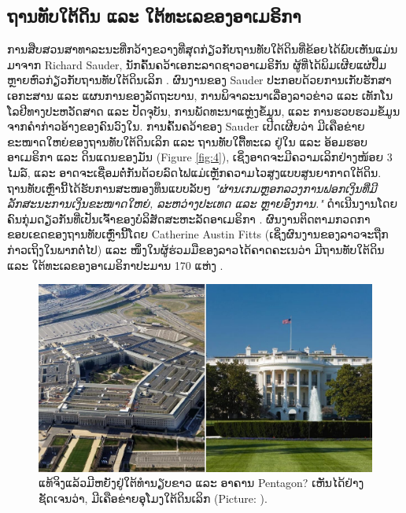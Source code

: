 \documentclass[10pt,twocolumn,letterpaper]{article}
\begin{document}
\subsection{ຖານທັບໃຕ້ດິນ ແລະ ໃຕ້ທະເລຂອງອາເມຣິກາ}

ການສືບສວນສາທາລະນະທີ່ກວ້າງຂວາງທີ່ສຸດກ່ຽວກັບຖານທັບໃຕ້ດິນທີ່ຂ້ອຍໄດ້ພົບເຫັນແມ່ນມາຈາກ Richard Sauder, ນັກຄົ້ນຄວ້າເອກະລາດຊາວອາເມຣິກັນ ຜູ້ທີ່ໄດ້ພິມເຜີຍແຜ່ປຶ້ມຫຼາຍຫົວກ່ຽວກັບຖານທັບໃຕ້ດິນເລິກ \cite{22}. 
ຜົນງານຂອງ Sauder ປະກອບດ້ວຍການເກັບຮັກສາເອກະສານ ແລະ ແຜນການຂອງລັດຖະບານ, ການພິຈາລະນາເລື່ອງລາວຂ່າວ ແລະ ເທັກໂນໂລຢີທາງປະຫວັດສາດ ແລະ ປັດຈຸບັນ, ການພັດທະນາແຫຼ່ງຂໍ້ມູນ, ແລະ ການຮວບຮວມຂໍ້ມູນຈາກຄຳກ່າວອ້າງຂອງຄົນວົງໃນ.
ການຄົ້ນຄວ້າຂອງ Sauder ເປີດເຜີຍວ່າ ມີເຄືອຂ່າຍຂະໜາດໃຫຍ່ຂອງຖານທັບໃຕ້ດິນເລິກ ແລະ ຖານທັບໃຕ້ືທະເລ ຢູ່ໃນ ແລະ ອ້ອມຮອບອາເມຣິກາ ແລະ ດິນແດນຂອງມັນ (Figure \ref{fig:4}), ເຊິ່ງອາດຈະມີຄວາມເລິກຢ່າງໜ້ອຍ 3 ໄມລ໌, ແລະ ອາດຈະເຊື່ອມຕໍ່ກັນດ້ວຍລົດໄຟແມ່ເຫຼັກຄວາມໄວສູງແບບສູນຍາກາດໃຕ້ດິນ. 
ຖານທັບເຫຼົ່ານີ້ໄດ້ຮັບການສະໜອງທຶນແບບລັບໆ \textit{"ຜ່ານເກມຫຼອກລວງການຟອກເງິນທີ່ມີລັກສະນະການເງິນຂະໜາດໃຫຍ່, ລະຫວ່າງປະເທດ ແລະ ຫຼາຍອົງການ."} ດໍາເນີນງານໂດຍຄົນກຸ່ມດຽວກັນທີ່ເປັນເຈົ້າຂອງບໍລິສັດສະຫະລັດອາເມຣິກາ \cite{22}. ຜົນງານຕິດຕາມກວດກາຂອບເຂດຂອງຖານທັບເຫຼົ່ານີ້ໂດຍ Catherine Austin Fitts  (ເຊິ່ງຜົນງານຂອງລາວຈະຖືກກ່າວເຖິງໃນພາກຕໍ່ໄປ) ແລະ ໜຶ່ງໃນຜູ້ຮ່ວມມືຂອງລາວໄດ້ຄາດຄະເນວ່າ ມີຖານທັບໃຕ້ດິນ ແລະ ໃຕ້ທະເລຂອງອາເມຣິກາປະມານ 170 ແຫ່ງ \cite{16,20}. 
\begin{figure}[b]
\begin{center}
   \includegraphics[width=1\linewidth]{penta.jpg}
\end{center}
   \caption{ແທ້ຈິງແລ້ວມີຫຍັງຢູ່ໃຕ້ທຳນຽບຂາວ ແລະ ອາຄານ Pentagon? ເຫັນໄດ້ຢ່າງຊັດເຈນວ່າ, ມີເຄືອຂ່າຍອຸໂມງໃຕ້ດິນເລິກ  (Picture: \cite{31}).}
\label{fig:3}
\label{fig:onecol}
\end{figure}
\end{document}
